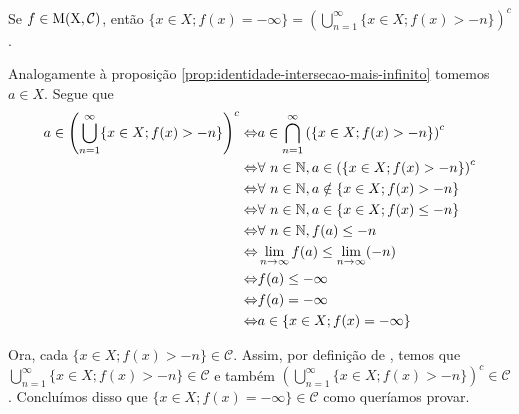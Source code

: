     \begin{proposition}
    \label{prop:identidade-união-menos-infinito}
        Se $f \in \operatorname{M(X, \mathcal{C} )}$, então $\{x \in X; f(x) = -\infty\} = \displaystyle \left(\bigcup_{n = 1}^\infty \{x \in X; f(x) > - n\}\right)^c$.
    \end{proposition}
    \begin{prova}
        Analogamente à proposição \ref{prop:identidade-intersecao-mais-infinito} tomemos $a \in X$. 
        Segue que 
        \begin{align*}
            a \in \left(\bigcup_{n = 1}^\infty \{x \in X; f(x) > - n\}\right)^c
            \Leftrightarrow & a \in \bigcap_{n = 1}^\infty \left(\{x \in X; f(x) > - n\}\right)^c\\
            \Leftrightarrow & \forall \ n \in \operatorname{\mathbb{N}}, a \in \left(\{x \in X; f(x) > - n\}\right)^c\\
            \Leftrightarrow & \forall \ n \in \operatorname{\mathbb{N}}, a \notin \{x \in X; f(x) > - n\}\\
            \Leftrightarrow & \forall \ n \in \operatorname{\mathbb{N}}, a \in \{x \in X; f(x) \leq - n\}\\
            \Leftrightarrow & \forall \ n \in \operatorname{\mathbb{N}}, f(a) \leq - n\\
            \Leftrightarrow & \lim_{n \to \infty} f(a) \leq \lim_{n \to \infty} (- n)\\            
            \Leftrightarrow & f(a) \leq -\infty\\            
            \Leftrightarrow & f(a) = -\infty\\            
            \Leftrightarrow & a \in \{x \in X; f(x) = -\infty\}            
        \end{align*}
        
    Ora, cada $\{x \in X; f(x) > - n\} \in \mathcal{C}$.
    Assim, por definição de \sigal, temos que $ \displaystyle\bigcup_{n = 1}^\infty \{x \in X; f(x) > - n\} \in \mathcal{C}$ e também 
    $\displaystyle\left(\bigcup_{n = 1}^\infty \{x \in X; f(x) > - n\}\right)^c \in \mathcal{C}$.
    Concluímos disso que $\{x \in X; f(x) = -\infty\} \in \mathcal{C}$ como queríamos provar. 
    \end{prova}

